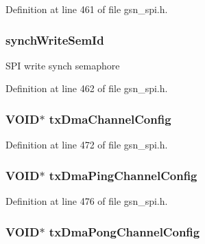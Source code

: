 Definition at line 461 of file gsn\_\-spi.h.

\hypertarget{a00230_ae01fab2e8492394ab72da071913c49fd}{
\subsubsection[{synchWriteSemId}]{ {\bf synchWriteSemId}}}
\label{a00230_ae01fab2e8492394ab72da071913c49fd}
SPI write synch semaphore 

Definition at line 462 of file gsn\_\-spi.h.

\hypertarget{a00230_a4c07197d124d1ed9e821f15b3b78a066}{
\subsubsection[{txDmaChannelConfig}]{\setlength{\rightskip}{0pt plus 5cm}VOID$\ast$ {\bf txDmaChannelConfig}}}
\label{a00230_a4c07197d124d1ed9e821f15b3b78a066}


Definition at line 472 of file gsn\_\-spi.h.

\hypertarget{a00230_aa0e5ef8888315014132a72402c5c8ba6}{
\subsubsection[{txDmaPingChannelConfig}]{\setlength{\rightskip}{0pt plus 5cm}VOID$\ast$ {\bf txDmaPingChannelConfig}}}
\label{a00230_aa0e5ef8888315014132a72402c5c8ba6}


Definition at line 476 of file gsn\_\-spi.h.

\hypertarget{a00230_a547f76d857761154a931bf0fd0f0a4ee}{
\subsubsection[{txDmaPongChannelConfig}]{\setlength{\rightskip}{0pt plus 5cm}VOID$\ast$ {\bf txDmaPongChannelConfig}}}
\label{a00230_a547f76d857761154a931bf0fd0f0a4ee}


